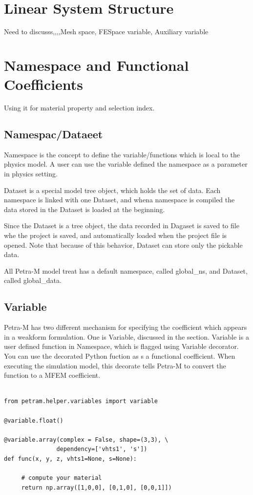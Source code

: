 \documentclass[11pt,a4paper,final]{report}
\begin{document}
\section{Linear System Structure}
Need to discusss,,,,Mesh space, FESpace variable, Auxiliary variable

\section{Namespace and Functional Coefficients}
Using it for material property and selection index.
\subsection{Namespac/Dataeet}
Namespace is the concept to define the variable/functions which is local to the physics model. 
A user can use the variable defined the namespace as a parameter in physics setting. 

Dataset is a special model tree object, which holds the set of data. 
Each namespace is linked with one Dataset, and whena namespace is compiled the data stored in the Dataset is loaded at the beginning. 

Since the Dataset is a tree object, the data recorded in Dagaset  is saved to file whe the project is saved, and automatically loaded when the project file is opened.
Note that because of this behavior, Dataset can store only the pickable data. 

All Petra-M model treat has a default namespace, called global\_ns, and Dataset, called global\_data.

\subsection{Variable}
Petra-M has two different mechanism for specifying the coefficient which appears in a weakform formulation. One is Variable, discussed in the section.
Variable is a user defined function in Namespace, which is flagged using Variable decorator.
You can use the decorated Python fuction as s a functional coefficient.
When executing the simulation model, this decorate tells Petra-M to convert the function to a MFEM coefficient. 

\begin{minipage}[c]{0.95\textwidth}
\begin{lstlisting}[caption={A user defined generic preconditioner},captionpos=b, frame=single, label={function1}]

from petram.helper.variables import variable

@variable.float()

@variable.array(complex = False, shape=(3,3), \
               dependency=['vhts1', 's'])
def func(x, y, z, vhts1=None, s=None):

     # compute your material
     return np.array([1,0,0], [0,1,0], [0,0,1]])

\end{lstlisting}
 \end{minipage}
 
\end{document}
